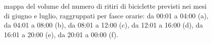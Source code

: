 \begin{figure}[htpb]
	\quad
	\caption[Mappa del volume del numero di ritiri di biciclette previsti nei mesi di giugno e luglio, raggruppati per fasce orarie]{mappa del volume del numero di ritiri di biciclette previsti nei mesi di giugno e luglio, raggruppati per fasce orarie: da 00:01 a 04:00 (a), da 04:01 a 08:00 (b), da 08:01 a 12:00 (c), da 12:01 a 16:00 (d), da 16:01 a 20:00 (e), da 20:01 a 00:00 (f).}
	\label{Krignig_giugno_e_lugio}
\end{figure}

